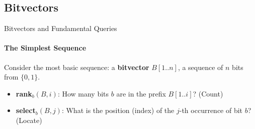 \subsection{Bitvectors} %

\begin{frame}{Bitvectors and Fundamental Queries}
    \framesubtitle{The Simplest Sequence}
    Consider the most basic sequence: a \textbf{bitvector} $B[1..n]$, a sequence of $n$ bits from $\{0, 1\}$.
    \begin{itemize}[<2->]
        \item \textbf{\textsf{rank}}$_b(B, i)$: How many bits $b$ are in the prefix $B[1..i]$? (Count)
        \item \textbf{\textsf{select}}$_b(B, j)$: What is the position (index) of the $j$-th occurrence of bit $b$? (Locate)
    \end{itemize}

    \begin{figure}[htbp]
        \centering
    \end{figure}

\end{frame}


